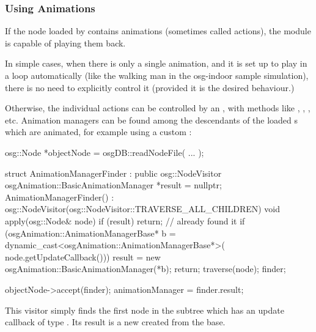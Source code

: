 \subsubsection{Using Animations}
\label{sec:graphics:osg-using-animations}


If the node loaded by  contains animations (sometimes called
actions), the  module is capable of playing them back.

In simple cases, when there is only a single animation, and it is set up to play
in a loop automatically (like the walking man in the osg-indoor sample simulation),
there is no need to explicitly control it (provided it is the desired behaviour.)

Otherwise, the individual actions can be controlled by an
, with methods like ,
, , etc. Animation managers can be
found among the descendants of the loaded s which are animated,
for example using a custom :

\begin{cpp}
osg::Node *objectNode = osgDB::readNodeFile( ... );

struct AnimationManagerFinder : public osg::NodeVisitor {
    osgAnimation::BasicAnimationManager *result = nullptr;
    AnimationManagerFinder()
      : osg::NodeVisitor(osg::NodeVisitor::TRAVERSE_ALL_CHILDREN) {}
    void apply(osg::Node& node) {
        if (result) return; // already found it
        if (osgAnimation::AnimationManagerBase* b =
              dynamic_cast<osgAnimation::AnimationManagerBase*>(
                node.getUpdateCallback())) {
            result = new osgAnimation::BasicAnimationManager(*b);
            return;
        }
        traverse(node);
    }
} finder;

objectNode->accept(finder);
animationManager = finder.result;
\end{cpp}

This visitor simply finds the first node in the subtree which has an update
callback of type . Its result is
a new  created from the
base.

